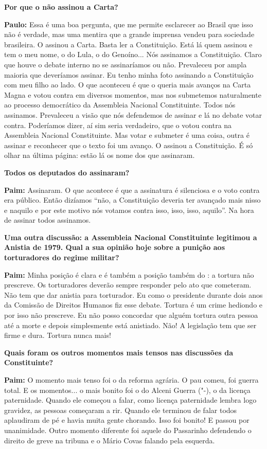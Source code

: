 \textbf{Por que o  não assinou a Carta?}

\textbf{Paulo:} Essa é uma boa pergunta, que me permite esclarecer ao
Brasil que isso não é verdade, mas uma mentira que a grande imprensa
vendeu para sociedade brasileira. O  assinou a Carta. Basta ler a
Constituição. Está lá quem assinou e tem o meu nome, o do Lula, o do
Genoíno... Nós assinamos a Constituição. Claro que houve o debate
interno no  se assinaríamos ou não. Prevaleceu por ampla maioria que
deveríamos assinar. Eu tenho minha foto assinando a Constituição com meu
filho ao lado. O que aconteceu é que o  queria mais avanços na Carta
Magna e votou contra em diversos momentos, mas nos submetemos
naturalmente ao processo democrático da Assembleia Nacional
Constituinte. Todos nós assinamos. Prevaleceu a visão que nós defendemos
de assinar e lá no debate votar contra. Poderíamos dizer, aí sim seria
verdadeiro, que o  votou contra na Assembleia Nacional Constituinte.
Mas votar e submeter é uma coisa, outra é assinar e reconhecer que o
texto foi um avanço. O  assinou a Constituição. É só olhar na última
página: estão lá os nome dos que assinaram.

\textbf{Todos os deputados do  assinaram?}

\textbf{Paim:} Assinaram. O que acontece é que a assinatura é silenciosa
e o voto contra era público. Então dizíamos ``não, a Constituição
deveria ter avançado mais nisso e naquilo e por este motivo nós votamos
contra isso, isso, isso, aquilo''. Na hora de assinar todos assinamos.

\textbf{Uma outra discussão: a Assembleia Nacional Constituinte
legitimou a Anistia de 1979. Qual a sua opinião hoje sobre a punição aos
torturadores do regime militar?}

\textbf{Paim:} Minha posição é clara e é também a posição também do :
a tortura não prescreve. Os torturadores deverão sempre responder pelo
ato que cometeram. Não tem que dar anistia para torturador. Eu como o
presidente durante dois anos da Comissão de Direitos Humanos fiz esse
debate. Tortura é um crime hediondo e por isso não prescreve. Eu não
posso concordar que alguém tortura outra pessoa até a morte e depois
simplesmente está anistiado. Não! A legislação tem que ser firme e dura.
Tortura nunca mais!

\textbf{Quais foram os outros momentos mais tensos nas discussões da
Constituinte?}

\textbf{Paim:} O momento mais tenso foi o da reforma agrária. O pau
comeu, foi guerra total. E os momentos... o mais bonito foi o do Alceni
Guerra ("-), o da licença paternidade. Quando ele começou a falar,
como licença paternidade lembra logo gravidez, as pessoas começaram a
rir. Quando ele terminou de falar todos aplaudiram de pé e havia muita
gente chorando. Isso foi bonito! E passou por unanimidade. Outro momento
diferente foi aquele do Passarinho defendendo o direito de greve na
tribuna e o Mário Covas falando pela esquerda.

